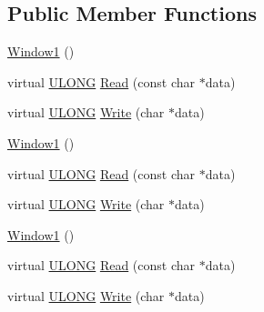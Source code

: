 \subsection*{Public Member Functions}
\begin{DoxyCompactItemize}
\item 
\hyperlink{struct_y_excel_1_1_workbook_1_1_window1_ab1ff3a128cca55bd5b819072e9b03705}{Window1} ()
\item 
virtual \hyperlink{_basic_excel_8hpp_abe09d1bea023be6a07cbadde8e955435}{U\+L\+O\+N\+G} \hyperlink{struct_y_excel_1_1_workbook_1_1_window1_aea7ebecd33c6bb5c6c816f4900780ecb}{Read} (const char $\ast$data)
\item 
virtual \hyperlink{_basic_excel_8hpp_abe09d1bea023be6a07cbadde8e955435}{U\+L\+O\+N\+G} \hyperlink{struct_y_excel_1_1_workbook_1_1_window1_a1bbf9fea9e491c7ccb754d237da50844}{Write} (char $\ast$data)
\item 
\hyperlink{struct_y_excel_1_1_workbook_1_1_window1_ab1ff3a128cca55bd5b819072e9b03705}{Window1} ()
\item 
virtual \hyperlink{_basic_excel_8hpp_abe09d1bea023be6a07cbadde8e955435}{U\+L\+O\+N\+G} \hyperlink{struct_y_excel_1_1_workbook_1_1_window1_ae132b8951c5d055c7d8bcd96efe48c1d}{Read} (const char $\ast$data)
\item 
virtual \hyperlink{_basic_excel_8hpp_abe09d1bea023be6a07cbadde8e955435}{U\+L\+O\+N\+G} \hyperlink{struct_y_excel_1_1_workbook_1_1_window1_a0a31d0575c1e3cedb609794d41ef5446}{Write} (char $\ast$data)
\item 
\hyperlink{struct_y_excel_1_1_workbook_1_1_window1_ab1ff3a128cca55bd5b819072e9b03705}{Window1} ()
\item 
virtual \hyperlink{_basic_excel_8hpp_abe09d1bea023be6a07cbadde8e955435}{U\+L\+O\+N\+G} \hyperlink{struct_y_excel_1_1_workbook_1_1_window1_ae132b8951c5d055c7d8bcd96efe48c1d}{Read} (const char $\ast$data)
\item 
virtual \hyperlink{_basic_excel_8hpp_abe09d1bea023be6a07cbadde8e955435}{U\+L\+O\+N\+G} \hyperlink{struct_y_excel_1_1_workbook_1_1_window1_a0a31d0575c1e3cedb609794d41ef5446}{Write} (char $\ast$data)
\end{DoxyCompactItemize}
